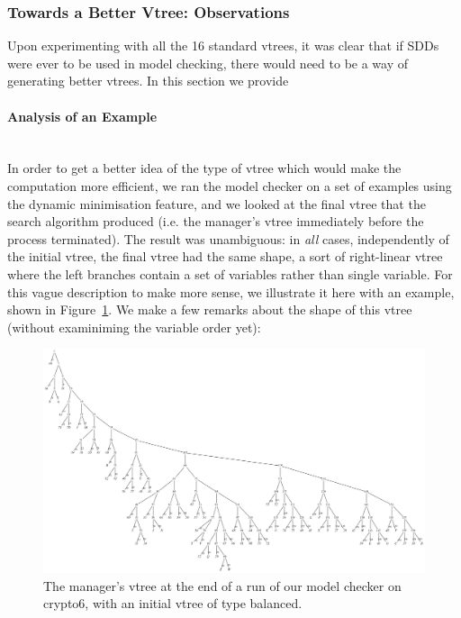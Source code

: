 \documentclass[11pt]{article}
\newcommand{\myparagraph}[1]{\paragraph{#1}\mbox{}\\}
\begin{document}
\subsubsection{Towards a Better Vtree: Observations}

Upon experimenting with all the 16 standard vtrees, it was clear that if SDDs were ever to be used in model checking, there would need to be a way of generating better vtrees. In this section we provide 


\myparagraph{Analysis of an Example}

In order to get a better idea of the type of vtree which would make the computation more efficient, we ran the model checker on a set of examples using the dynamic minimisation feature, and we looked at the final vtree that the search algorithm produced (i.e. the manager's vtree immediately before the process terminated). The result was unambiguous: in \textit{all} cases, independently of the initial vtree, the final vtree had the same shape, a sort of right-linear vtree where the left branches contain a set of variables rather than single variable. For this vague description to make more sense, we illustrate it here with an example, shown in Figure~\ref{fig:large_vtree_after_reordering}. 
We make a few remarks about the shape of this vtree (without examiniming the variable order yet):
\begin{figure}
\includegraphics[scale=0.3]{largevtreeafterdao.png}
\caption{The manager's vtree at the end of a run of our model checker on crypto6, with an initial vtree of type balanced.}
\label{fig:large_vtree_after_reordering}
\end{figure}
\end{document}
